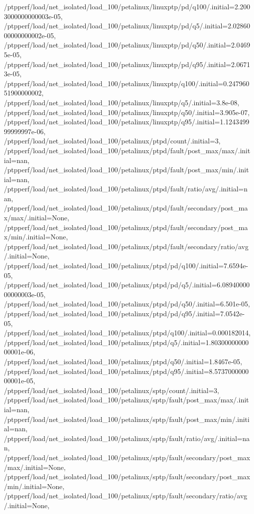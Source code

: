 {    /ptpperf/load/net_isolated/load_100/petalinux/linuxptp/pd/q100/.initial=2.2003000000000003e-05,
    /ptpperf/load/net_isolated/load_100/petalinux/linuxptp/pd/q5/.initial=2.0286000000000002e-05,
    /ptpperf/load/net_isolated/load_100/petalinux/linuxptp/pd/q50/.initial=2.04695e-05,
    /ptpperf/load/net_isolated/load_100/petalinux/linuxptp/pd/q95/.initial=2.06713e-05,
    /ptpperf/load/net_isolated/load_100/petalinux/linuxptp/q100/.initial=0.24796051900000002,
    /ptpperf/load/net_isolated/load_100/petalinux/linuxptp/q5/.initial=3.8e-08,
    /ptpperf/load/net_isolated/load_100/petalinux/linuxptp/q50/.initial=3.905e-07,
    /ptpperf/load/net_isolated/load_100/petalinux/linuxptp/q95/.initial=1.124349999999997e-06,
    /ptpperf/load/net_isolated/load_100/petalinux/ptpd/count/.initial=3,
    /ptpperf/load/net_isolated/load_100/petalinux/ptpd/fault/post_max/max/.initial=nan,
    /ptpperf/load/net_isolated/load_100/petalinux/ptpd/fault/post_max/min/.initial=nan,
    /ptpperf/load/net_isolated/load_100/petalinux/ptpd/fault/ratio/avg/.initial=nan,
    /ptpperf/load/net_isolated/load_100/petalinux/ptpd/fault/secondary/post_max/max/.initial=None,
    /ptpperf/load/net_isolated/load_100/petalinux/ptpd/fault/secondary/post_max/min/.initial=None,
    /ptpperf/load/net_isolated/load_100/petalinux/ptpd/fault/secondary/ratio/avg/.initial=None,
    /ptpperf/load/net_isolated/load_100/petalinux/ptpd/pd/q100/.initial=7.6594e-05,
    /ptpperf/load/net_isolated/load_100/petalinux/ptpd/pd/q5/.initial=6.0894000000000003e-05,
    /ptpperf/load/net_isolated/load_100/petalinux/ptpd/pd/q50/.initial=6.501e-05,
    /ptpperf/load/net_isolated/load_100/petalinux/ptpd/pd/q95/.initial=7.0542e-05,
    /ptpperf/load/net_isolated/load_100/petalinux/ptpd/q100/.initial=0.000182014,
    /ptpperf/load/net_isolated/load_100/petalinux/ptpd/q5/.initial=1.8030000000000001e-06,
    /ptpperf/load/net_isolated/load_100/petalinux/ptpd/q50/.initial=1.8467e-05,
    /ptpperf/load/net_isolated/load_100/petalinux/ptpd/q95/.initial=8.573700000000001e-05,
    /ptpperf/load/net_isolated/load_100/petalinux/sptp/count/.initial=3,
    /ptpperf/load/net_isolated/load_100/petalinux/sptp/fault/post_max/max/.initial=nan,
    /ptpperf/load/net_isolated/load_100/petalinux/sptp/fault/post_max/min/.initial=nan,
    /ptpperf/load/net_isolated/load_100/petalinux/sptp/fault/ratio/avg/.initial=nan,
    /ptpperf/load/net_isolated/load_100/petalinux/sptp/fault/secondary/post_max/max/.initial=None,
    /ptpperf/load/net_isolated/load_100/petalinux/sptp/fault/secondary/post_max/min/.initial=None,
    /ptpperf/load/net_isolated/load_100/petalinux/sptp/fault/secondary/ratio/avg/.initial=None,
}
